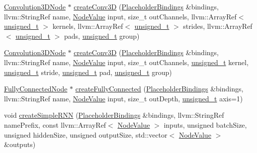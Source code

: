 \begin{Indent}
\begin{DoxyCompactItemize}
\item 
\hyperlink{classglow_1_1_convolution3_d_node}{Convolution3\+D\+Node} $\ast$ \hyperlink{classglow_1_1_function_aaad3ec8a2afa0bcfcb21a55719f3df4f}{create\+Conv3D} (\hyperlink{classglow_1_1_placeholder_bindings}{Placeholder\+Bindings} \&bindings, llvm\+::\+String\+Ref name, \hyperlink{structglow_1_1_node_value}{Node\+Value} input, size\+\_\+t out\+Channels, llvm\+::\+Array\+Ref$<$ \hyperlink{namespaceglow_a0ca574644e1e42ef193a9947fb4d8911}{unsigned\+\_\+t} $>$ kernels, llvm\+::\+Array\+Ref$<$ \hyperlink{namespaceglow_a0ca574644e1e42ef193a9947fb4d8911}{unsigned\+\_\+t} $>$ strides, llvm\+::\+Array\+Ref$<$ \hyperlink{namespaceglow_a0ca574644e1e42ef193a9947fb4d8911}{unsigned\+\_\+t} $>$ pads, \hyperlink{namespaceglow_a0ca574644e1e42ef193a9947fb4d8911}{unsigned\+\_\+t} group)
\item 
\hyperlink{classglow_1_1_convolution3_d_node}{Convolution3\+D\+Node} $\ast$ \hyperlink{classglow_1_1_function_a99742506dcf9c372bb92cf74e8160de2}{create\+Conv3D} (\hyperlink{classglow_1_1_placeholder_bindings}{Placeholder\+Bindings} \&bindings, llvm\+::\+String\+Ref name, \hyperlink{structglow_1_1_node_value}{Node\+Value} input, size\+\_\+t out\+Channels, \hyperlink{namespaceglow_a0ca574644e1e42ef193a9947fb4d8911}{unsigned\+\_\+t} kernel, \hyperlink{namespaceglow_a0ca574644e1e42ef193a9947fb4d8911}{unsigned\+\_\+t} stride, \hyperlink{namespaceglow_a0ca574644e1e42ef193a9947fb4d8911}{unsigned\+\_\+t} pad, \hyperlink{namespaceglow_a0ca574644e1e42ef193a9947fb4d8911}{unsigned\+\_\+t} group)
\item 
\hyperlink{classglow_1_1_fully_connected_node}{Fully\+Connected\+Node} $\ast$ \hyperlink{classglow_1_1_function_ade9306e5e5d5665e16fc64dcf8df3e94}{create\+Fully\+Connected} (\hyperlink{classglow_1_1_placeholder_bindings}{Placeholder\+Bindings} \&bindings, llvm\+::\+String\+Ref name, \hyperlink{structglow_1_1_node_value}{Node\+Value} input, size\+\_\+t out\+Depth, \hyperlink{namespaceglow_a0ca574644e1e42ef193a9947fb4d8911}{unsigned\+\_\+t} axis=1)
\item 
void \hyperlink{classglow_1_1_function_a5aa2b425049f5e2868062da4ca7c438e}{create\+Simple\+R\+NN} (\hyperlink{classglow_1_1_placeholder_bindings}{Placeholder\+Bindings} \&bindings, llvm\+::\+String\+Ref name\+Prefix, const llvm\+::\+Array\+Ref$<$ \hyperlink{structglow_1_1_node_value}{Node\+Value} $>$ inputs, unsigned batch\+Size, unsigned hidden\+Size, unsigned output\+Size, std\+::vector$<$ \hyperlink{structglow_1_1_node_value}{Node\+Value} $>$ \&outputs)
\item 

\end{DoxyCompactItemize}
\end{Indent}
